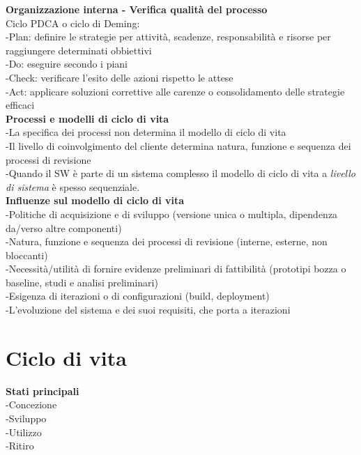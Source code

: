 \documentclass{article}
\begin{document}
		\textbf{Organizzazione interna - Verifica qualità del processo}\\
		Ciclo PDCA o ciclo di Deming:\\
		-Plan: definire le strategie per attività, scadenze, responsabilità e risorse per raggiungere determinati obbiettivi\\
		-Do: eseguire secondo i piani\\
		-Check: verificare l'esito delle azioni rispetto le attese\\
		-Act: applicare soluzioni correttive alle carenze o consolidamento delle strategie efficaci\\
		
		\textbf{Processi e modelli di ciclo di vita}\\
		-La specifica dei processi non determina il modello di ciclo di vita\\
		-Il livello di coinvolgimento del cliente determina natura, funzione e sequenza dei processi di revisione\\
		-Quando il SW è parte di un sistema complesso il modello di ciclo di vita a \textit{livello di sistema} è spesso sequenziale.\\
		
		\textbf{Influenze sul modello di ciclo di vita}\\
		-Politiche di acquisizione e di sviluppo (versione unica o multipla, dipendenza da/verso altre componenti)\\
		-Natura, funzione e sequenza dei processi di revisione (interne, esterne, non bloccanti)\\
		-Necessità/utilità di fornire evidenze preliminari di fattibilità (prototipi bozza o baseline, studi e analisi preliminari)\\
		-Esigenza di iterazioni o di configurazioni (build, deployment)\\
		-L'evoluzione del sistema e dei suoi requisiti, che	porta a iterazioni\\
			
			
			
	\clearpage
	\section{Ciclo di vita}
	
		\textbf{Stati principali}\\
		-Concezione\\
		-Sviluppo\\
		-Utilizzo\\
		-Ritiro\\
		
\end{document}
